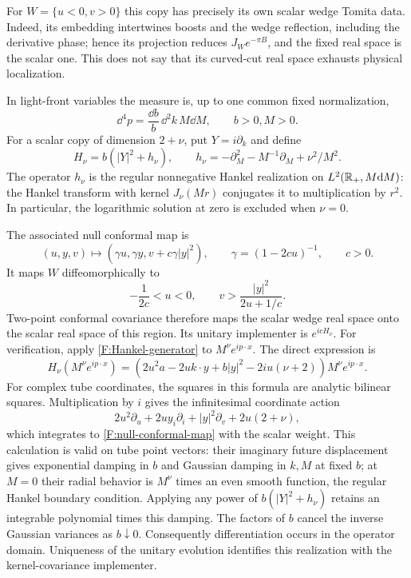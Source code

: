 For $W=\{u<0,v>0\}$ this copy has precisely its own scalar wedge
Tomita data. Indeed, its embedding intertwines boosts and the wedge
reflection, including the derivative phase; hence its projection reduces
$J_We^{-\pi B}$, and the fixed real space is the scalar one. This does
not say that its curved-cut real space exhausts physical localization.

In light-front variables the measure is, up to one common fixed
normalization,
\begin{equation}\label{F:lightfront-measure}
 \dd^4p=\frac{\dd b}{b}\,\dd^2k\,M\dd M,
 \qquad b>0, M>0.
\end{equation}
For a scalar copy of dimension $2+\nu$, put $Y=i\partial_k$ and define
\begin{equation}\label{F:Hankel-generator}
 H_\nu=b(|Y|^2+h_\nu),\qquad
 h_\nu=-\partial_M^2-M^{-1}\partial_M+\nu^2/M^2.
\end{equation}
The operator $h_\nu$ is the regular nonnegative Hankel realization on
$L^2(\mathbb R_+,M\mathrm d M)$: the Hankel transform with kernel $J_\nu(Mr)$
conjugates it to multiplication by $r^2$. In particular, the logarithmic
solution at zero is excluded when $\nu=0$.

The associated null conformal map is
\begin{equation}\label{F:null-conformal-map}
 (u,y,v)\longmapsto
 (\gamma u,\gamma y,v+c\gamma|y|^2),\qquad
 \gamma=(1-2cu)^{-1},\qquad c>0.
\end{equation}
It maps $W$ diffeomorphically to
\[
 -\frac1{2c}<u<0,\qquad
 v>\frac{|y|^2}{2u+1/c}.
\]
Two-point conformal covariance therefore maps the scalar wedge real
space onto the scalar real space of this region. Its unitary implementer
is $e^{icH_\nu}$. For verification, apply \eqref{F:Hankel-generator} to
$M^\nu e^{ip\cdot x}$. The direct expression is
\[
 H_\nu(M^\nu e^{ip\cdot x})
 =\left(2u^2a-2u k\cdot y+b|y|^2-2iu(\nu+2)\right)
       M^\nu e^{ip\cdot x}.
\]
For complex tube coordinates, the squares in this formula are analytic
bilinear squares. Multiplication by $i$ gives the infinitesimal
coordinate action
\[
 2u^2\partial_u+2uy_i\partial_i+|y|^2\partial_v
       +2u(2+\nu),
\]
which integrates to \eqref{F:null-conformal-map} with the scalar weight.
This calculation is valid on tube point vectors: their imaginary
future displacement gives exponential damping in $b$ and Gaussian
damping in $k,M$ at fixed $b$; at $M=0$ their radial behavior is
$M^\nu$ times an even smooth function, the regular Hankel boundary
condition. Applying any power of $b(|Y|^2+h_\nu)$ retains an integrable
polynomial times this damping. The factors of $b$ cancel the inverse
Gaussian variances as $b\downarrow0$. Consequently differentiation
occurs in the operator domain. Uniqueness of the unitary evolution
identifies this realization with the kernel-covariance implementer.

